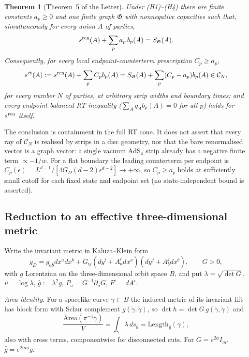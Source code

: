 \documentclass[aps,prd,onecolumn,superscriptaddress,nofootinbib,amsmath,amssymb,11pt]{revtex4-2}
\newtheorem{theorem}{Theorem}[section]
\theoremstyle{definition}
\newcommand{\CN}{\mathcal{C}_N}
\newcommand{\eps}{\epsilon}
\begin{document}
\begin{theorem}[Theorem~5 of the Letter]\label{thm:strips}
Under (H1)--(H4) there are finite constants $a_p\ge0$ and one finite graph $\mathfrak G$ with nonnegative capacities such that,
simultaneously for every union $A$ of parties,
\begin{equation}\label{eq:T1}
s^{\rm ren}(A)+\sum_pa_p\,b_p(A)=S_{\mathfrak G}(A).
\end{equation}
Consequently, for every local endpoint-counterterm prescription $C_p\ge a_p$,
\begin{equation}\label{eq:T2}
s^{\rm ct}(A):=s^{\rm ren}(A)+\sum_pC_pb_p(A)=S_{\mathfrak G}(A)+\sum_p(C_p-a_p)b_p(A)\in\CN,
\end{equation}
for every number $N$ of parties, at arbitrary strip widths and boundary times; and every endpoint-balanced RT inequality
($\sum_Aq_Ab_p(A)=0$ for all $p$) holds for $s^{\rm ren}$ itself.
\end{theorem}

The conclusion is containment in the full RT cone. It does not assert that every ray of $\CN$ is realised by strips in a disc
geometry, nor that the bare renormalised vector is a graph vector: a single vacuum $\mathrm{AdS}_4$ strip already has a
negative finite term $\propto-1/w$. For a flat boundary the leading counterterm per endpoint is
$C_p(\eps)=L^{d-1}/[4G_D(d-2)\eps^{d-2}]\to+\infty$, so $C_p\ge a_p$ holds at sufficiently small cutoff for each fixed state
and endpoint set (no state-independent bound is asserted).

\subsection{Reduction to an effective three-dimensional metric}\label{sec:stripred}

Write the invariant metric in Kaluza--Klein form
\begin{equation}\label{eq:KK}
g_D=g_{ab}dx^adx^b+G_{ij}(dy^i+A^i_adx^a)(dy^j+A^j_bdx^b),\qquad G>0,
\end{equation}
with $g$ Lorentzian on the three-dimensional orbit space $B$, and put $\lambda=\sqrt{\det G}$, $u=\log\lambda$,
$\widehat g:=\lambda^2g$, $P_a=G^{-1}\partial_aG$, $F^i=dA^i$.

\emph{Area identity.} For a spacelike curve $\gamma\subset B$ the induced metric of its invariant lift has block form with Schur
complement $g(\dot\gamma,\dot\gamma)$, so $\det h=\det G\,g(\dot\gamma,\dot\gamma)$ and
\begin{equation}\label{eq:T3}
\frac{\mathrm{Area}(\pi^{-1}\gamma)}{V}=\int_\gamma\lambda\,ds_g=\mathrm{Length}_{\widehat g}(\gamma),
\end{equation}
also with cross terms, componentwise for disconnected cuts. For $G=e^{2\phi}I_m$, $\widehat g=e^{2m\phi}g$.
\end{document}
